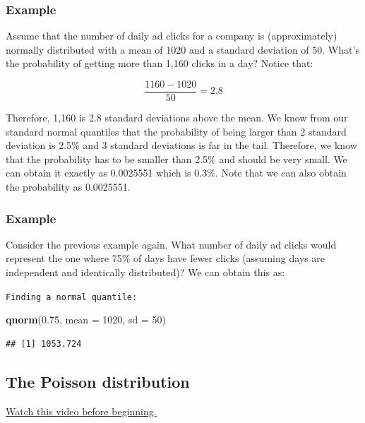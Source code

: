 \documentclass[]{article}
\newenvironment{Shaded}{\begin{snugshade}}{\end{snugshade}}
\newcommand{\KeywordTok}[1]{\textcolor[rgb]{0.13,0.29,0.53}{\textbf{{#1}}}}
\newcommand{\DataTypeTok}[1]{\textcolor[rgb]{0.13,0.29,0.53}{{#1}}}
\newcommand{\DecValTok}[1]{\textcolor[rgb]{0.00,0.00,0.81}{{#1}}}
\newcommand{\FloatTok}[1]{\textcolor[rgb]{0.00,0.00,0.81}{{#1}}}
\newcommand{\NormalTok}[1]{{#1}}
\begin{document}
\subsubsection{Example}\label{example-12}

Assume that the number of daily ad clicks for a company is
(approximately) normally distributed with a mean of 1020 and a standard
deviation of 50. What's the probability of getting more than 1,160
clicks in a day? Notice that:

\[
\frac{1160 - 1020}{50} = 2.8
\]

Therefore, 1,160 is 2.8 standard deviations above the mean. We know from
our standard normal quantiles that the probability of being larger than
2 standard deviation is 2.5\% and 3 standard deviations is far in the
tail. Therefore, we know that the probability has to be smaller than
2.5\% and should be very small. We can obtain it exactly as 0.0025551
which is 0.3\%. Note that we can also obtain the probability as
0.0025551.

\subsubsection{Example}\label{example-13}

Consider the previous example again. What number of daily ad clicks
would represent the one where 75\% of days have fewer clicks (assuming
days are independent and identically distributed)? We can obtain this
as:

\vspace{1pc}

\verb;Finding a normal quantile:;

\begin{Shaded}
\begin{Highlighting}[]
\KeywordTok{qnorm}\NormalTok{(}\FloatTok{0.75}\NormalTok{, }\DataTypeTok{mean =} \DecValTok{1020}\NormalTok{, }\DataTypeTok{sd =} \DecValTok{50}\NormalTok{)}
\end{Highlighting}
\end{Shaded}

\begin{verbatim}
## [1] 1053.724
\end{verbatim}

\subsection{The Poisson distribution}\label{the-poisson-distribution}

\href{http://youtu.be/ZPLZg7qz4xE?list=PLpl-gQkQivXiBmGyzLrUjzsblmQsLtkzJ}{Watch
this video before beginning.}
\end{document}
